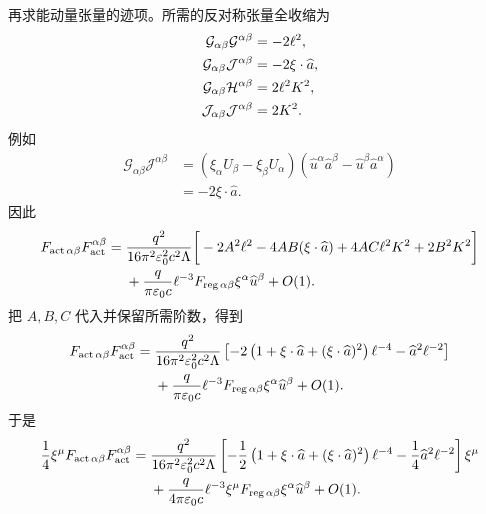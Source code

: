 再求能动量张量的迹项。所需的反对称张量全收缩为
\begin{align}
 \mathcal G_{\alpha\beta}\mathcal G^{\alpha\beta}
 &=-2\ell^2,
 \notag\\
 \mathcal G_{\alpha\beta}\mathcal J^{\alpha\beta}
 &=-2\xi\cdot \widehat a,
 \notag\\
 \mathcal G_{\alpha\beta}\mathcal H^{\alpha\beta}
 &=2\ell^2K^2,
 \notag\\
 \mathcal J_{\alpha\beta}\mathcal J^{\alpha\beta}
 &=2K^2.
 \label{eq:dirac-detail-scalar-products}
\end{align}
例如
\begin{align*}
 \mathcal G_{\alpha\beta}\mathcal J^{\alpha\beta}
 &=(\xi_\alpha U_\beta-\xi_\beta U_\alpha)
 (\widehat u^\alpha \widehat a^\beta-\widehat u^\beta \widehat a^\alpha)\\
 &=-2\xi\cdot \widehat a.
\end{align*}
因此
\begin{align}
 F_{\mathrm{act}\,\alpha\beta}F_{\mathrm{act}}^{\alpha\beta}
 ={}&{q^2\over16\pi^2\varepsilon_0^2c^2\Lambda}
 \bigg[
 -2A^2\ell^2
 -4AB(\xi\cdot \widehat a)
 +4AC\ell^2K^2
 +2B^2K^2
 \bigg]
 \notag\\
 &+{q\over\pi\varepsilon_0c}\ell^{-3}
 F_{\mathrm{reg}\,\alpha\beta}\xi^\alpha \widehat u^\beta
 +O(1).
 \label{eq:dirac-detail-F2-before-coefficients}
\end{align}
把 $A,B,C$ 代入并保留所需阶数，得到
\begin{align}
 F_{\mathrm{act}\,\alpha\beta}F_{\mathrm{act}}^{\alpha\beta}
 ={}&{q^2\over16\pi^2\varepsilon_0^2c^2\Lambda}
 \left[
 -2\left(1+\xi\cdot \widehat a+(\xi\cdot \widehat a)^2\right)\ell^{-4}
 -\widehat a^2\ell^{-2}
 \right]
 \notag\\
 &+{q\over\pi\varepsilon_0c}\ell^{-3}
 F_{\mathrm{reg}\,\alpha\beta}\xi^\alpha \widehat u^\beta
 +O(1).
 \label{eq:dirac-detail-F2-expanded}
\end{align}
于是
\begin{align}
 {1\over4}\xi^\mu
 F_{\mathrm{act}\,\alpha\beta}F_{\mathrm{act}}^{\alpha\beta}
 ={}&{q^2\over16\pi^2\varepsilon_0^2c^2\Lambda}
 \left[
 -{1\over2}
 \left(1+\xi\cdot \widehat a+(\xi\cdot \widehat a)^2\right)\ell^{-4}
 -{1\over4}\widehat a^2\ell^{-2}
 \right]\xi^\mu
 \notag\\
 &+{q\over4\pi\varepsilon_0c}\ell^{-3}
 \xi^\mu F_{\mathrm{reg}\,\alpha\beta}
 \xi^\alpha \widehat u^\beta+O(1).
 \label{eq:dirac-detail-trace-contribution}
\end{align}

